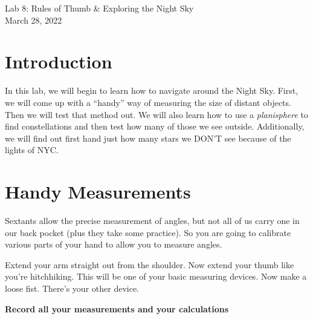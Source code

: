 \documentclass[11pt]{article}
\begin{document}
\begin{center}
\huge{Lab 8: Rules of Thumb \& Exploring the Night Sky}\\ \medskip \Large{March 28, 2022}
\end{center}

\section{Introduction}

In this lab, we will begin to learn how to navigate around the Night Sky.  First, we will come up with a ``handy'' way of measuring the size of distant objects.  Then we will test that method out.  We will also learn how to use a \textit{planisphere} to find constellations and then test how many of those we see outside.  Additionally, we will find out first hand just how many stars we DON'T see because of the lights of NYC.

\section{Handy Measurements}

Sextants allow the precise measurement of angles, but not all of us carry one in our back pocket (plus they take some practice). So you are going to calibrate various parts of your hand to allow you to measure angles.

\medskip \noindent
Extend your arm straight out from the shoulder. Now extend your thumb like you're hitchhiking. This will be one of your basic measuring devices. Now make a loose fist. There's your other device.

\medskip \noindent
\textbf{Record all your measurements and your calculations}
\end{document}
